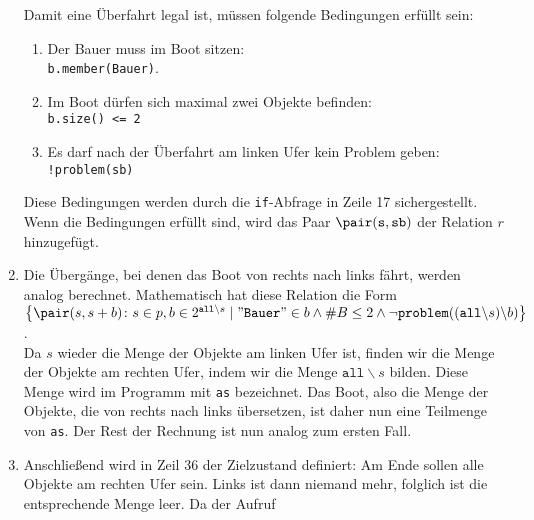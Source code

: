 \begin{enumerate}
      Damit eine Überfahrt legal ist, m\"ussen folgende Bedingungen erf\"ullt sein:
      \begin{enumerate}
      \item Der Bauer muss im Boot sitzen: 
            \\[0.2cm]
            \hspace*{1.3cm}
            \texttt{b.member(Bauer)}.
      \item Im Boot d\"urfen sich maximal zwei Objekte befinden:
            \\[0.2cm]
            \hspace*{1.3cm}
            \texttt{b.size() <= 2}
      \item Es darf nach der Überfahrt am linken Ufer kein Problem geben:
            \\[0.2cm]
            \hspace*{1.3cm}
            \texttt{!problem(sb)}
      \end{enumerate}
      Diese Bedingungen werden durch die \texttt{if}-Abfrage in Zeile 17 sichergestellt.
      Wenn die Bedingungen erf\"ullt sind, wird das Paar $\pair(\mathtt{s}, \mathtt{sb})$
      der Relation $r$ hinzugef\"ugt.
\item Die Überg\"ange, bei denen das Boot von rechts nach links f\"ahrt, werden analog
      berechnet.  Mathematisch hat diese Relation die Form
      \\[0.2cm]
      \hspace*{1.3cm}
      $\bigl\{ \pair(s, s + b) \colon s \in p, b \in 2^{\mathtt{all} \backslash s} \mid
              \mathtt{\symbol{34}Bauer\symbol{34}} \in b \wedge \#B \leq 2 \wedge \neg
              \mathtt{problem}((\mathtt{all} \backslash s) \backslash b) 
       \bigr\}
      $.
      \\[0.2cm]
      Da $s$ wieder die Menge der Objekte am linken Ufer ist, finden wir die Menge der Objekte
      am rechten Ufer, indem wir die Menge $\mathtt{all} \backslash s$ bilden.  Diese
      Menge wird im Programm mit \texttt{as} bezeichnet.  Das Boot, also die Menge der
      Objekte, die von rechts nach links \"ubersetzen, ist daher nun eine Teilmenge von \texttt{as}.
      Der Rest der Rechnung ist nun analog zum ersten Fall.
\item Anschlie{\ss}end wird in Zeil 36 der Zielzustand definiert:
      Am Ende sollen alle Objekte am rechten Ufer sein.  Links ist dann niemand mehr,
      folglich ist die entsprechende Menge leer.  Da der Aufruf
      \\[0.2cm]

\end{enumerate}
